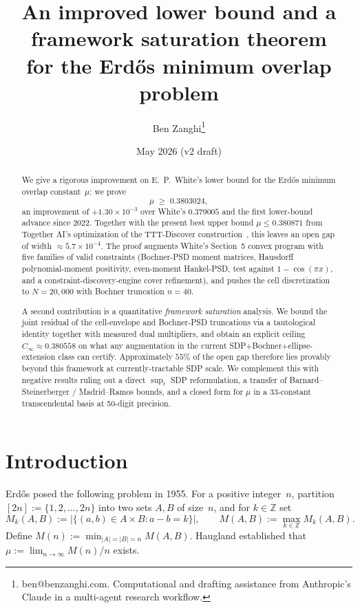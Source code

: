 \documentclass[11pt]{article}
\title{An improved lower bound and a framework saturation theorem\\
for the Erd\H{o}s minimum overlap problem}
\author{Ben Zanghi\thanks{ben@benzanghi.com. Computational and drafting
assistance from Anthropic's Claude in a multi-agent research workflow.}}
\date{May 2026 (v2 draft)}
\theoremstyle{plain}
\theoremstyle{definition}
\begin{document}
\maketitle

\begin{abstract}
We give a rigorous improvement on E.~P.~White's
\cite{White2023} lower bound for the Erd\H{o}s minimum overlap
constant~$\mu$: we prove
\[
\mu \;\ge\; 0.3803024,
\]
an improvement of $+1.30 \times 10^{-3}$ over White's $0.379005$ and the
first lower-bound advance since 2022. Together with the present best
upper bound $\mu \le 0.380871$ from Together AI's optimization of the
TTT-Discover construction~\cite{TogetherComputer2026,TTTDiscover2026},
this leaves an open gap of width
$\approx 5.7 \times 10^{-4}$. The proof augments White's Section~5
convex program with five families of valid constraints
(Bochner-PSD moment matrices, Hausdorff polynomial-moment positivity,
even-moment Hankel-PSD, test against $1-\cos(\pi x)$, and a
constraint-discovery-engine cover refinement), and pushes the cell
discretization to $N = 20{,}000$ with Bochner truncation
$n = 40$.

A second contribution is a quantitative \emph{framework saturation}
analysis. We bound the joint residual of the cell-envelope and
Bochner-PSD truncations via a tautological identity together with
measured dual multipliers, and obtain an explicit ceiling
$C_\infty \approx 0.380558$ on what any augmentation in the current
SDP+Bochner+ellipse-extension class can certify. Approximately $55\%$
of the open gap therefore lies provably beyond this framework at
currently-tractable SDP scale. We complement this with negative results
ruling out a direct $\sup_t$ SDP reformulation, a transfer of
Barnard--Steinerberger / Madrid--Ramos bounds, and a closed form for
$\mu$ in a 33-constant transcendental basis at 50-digit precision.
\end{abstract}

\section{Introduction}

Erd\H{o}s \cite{Erdos1955} posed the following problem in 1955. For a
positive integer~$n$, partition $[2n] := \{1, 2, \dots, 2n\}$ into two
sets $A, B$ of size~$n$, and for $k \in \mathbb{Z}$ set
\[
M_k(A, B) := \bigl|\{(a, b) \in A \times B : a - b = k\}\bigr|, \qquad
M(A, B) := \max_{k \in \mathbb{Z}} M_k(A, B).
\]
Define $M(n) := \min_{|A| = |B| = n} M(A, B)$. Haugland \cite{Haugland2016}
established that $\mu := \lim_{n \to \infty} M(n)/n$ exists.
\end{document}
